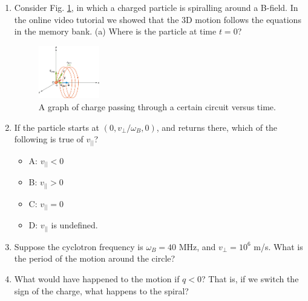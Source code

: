 \documentclass{article}
\begin{document}
\begin{enumerate}
\item Consider Fig. \ref{fig:lorentz}, in which a charged particle is spiralling around a B-field. In the online video tutorial we showed that the 3D motion follows the equations in the memory bank.  (a) Where is the particle at time $t=0$?
\begin{figure}[ht]
\centering
\includegraphics[width=0.25\textwidth]{lorentzSpiral.jpeg}
\caption{\label{fig:lorentz} A graph of charge passing through a certain circuit versus time.}
\end{figure}
\item If the particle starts at $(0,v_{\perp}/\omega_B,0)$, and returns there, which of the following is true of $v_{||}$?
\begin{itemize}
\item A: $v_{||} < 0$
\item B: $v_{||} > 0$
\item C: $v_{||} = 0$
\item D: $v_{||}$ is undefined.
\end{itemize}
\item Suppose the cyclotron frequency is $\omega_B = 40$ MHz, and $v_{\perp} = 10^{6}$ m/s.  What is the period of the motion around the circle? \\ \vspace{2cm}
\item What would have happened to the motion if $q < 0$?  That is, if we switch the sign of the charge, what happens to the spiral?
\end{enumerate}
\end{document}
